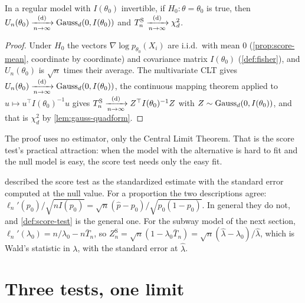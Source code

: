 
\begin{theorem}
\label{thm:score}
In a regular model with $I(\theta_0)$ invertible, if $H_0: \theta = \theta_0$ is true, then $U_n(\theta_0) \xrightarrow [n \to \infty ]{\text{(d)}} \text{Gauss}_d(0, I(\theta_0))$ and $T^{\mathrm{S}}_n \xrightarrow [n \to \infty ]{\text{(d)}} \chi^2_d$.
\end{theorem}

\begin{proof}
Under $H_0$ the vectors $\nabla\log p_{\theta_0}(X_i)$ are i.i.d.\ with mean $0$ (\cref{prop:score-mean}, coordinate by coordinate) and covariance matrix $I(\theta_0)$ (\cref{def:fisher}), and $U_n(\theta_0)$ is $\sqrt{n}$ times their average.
The multivariate CLT gives $U_n(\theta_0) \xrightarrow [n \to \infty ]{\text{(d)}} \text{Gauss}_d(0, I(\theta_0))$, the continuous mapping theorem applied to $u \mapsto u^\top I(\theta_0)^{-1}u$ gives $T^{\mathrm{S}}_n \xrightarrow [n \to \infty ]{\text{(d)}} Z^\top I(\theta_0)^{-1}Z$ with $Z \sim \text{Gauss}_d(0, I(\theta_0))$, and that is $\chi^2_d$ by \cref{lem:gauss-quadform}.
\end{proof}

The proof uses no estimator, only the Central Limit Theorem.
That is the score test's practical attraction: when the model with the alternative is hard to fit and the null model is easy, the score test needs only the easy fit.

 described the score test as the standardized estimate with the standard error computed at the null value.
For a proportion the two descriptions agree: $\ell_n'(p_0)/\sqrt{nI(p_0)} = \sqrt{n}(\hat{p} - p_0)/\sqrt{p_0(1 - p_0)}$.
In general they do not, and \cref{def:score-test} is the general one.
For the subway model of the next section, $\ell_n'(\lambda_0) = n/\lambda_0 - n\bar{T}_n$, so $Z^{\mathrm{S}}_n = \sqrt{n}(1 - \lambda_0\bar{T}_n) = \sqrt{n}(\hat{\lambda} - \lambda_0)/\hat{\lambda}$, which is Wald's statistic in $\lambda$, with the standard error at $\hat{\lambda}$.

\section{Three tests, one limit}
\label{sec:wlr-compare}

